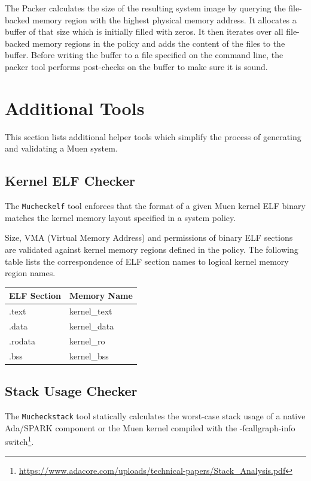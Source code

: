\documentclass[a4paper,twoside,titlepage]{article}
\begin{document}
The Packer calculates the size of the resulting system image by querying the
file-backed memory region with the highest physical memory address. It
allocates a buffer of that size which is initially filled with zeros. It then
iterates over all file-backed memory regions in the policy and adds the content
of the files to the buffer. Before writing the buffer to a file specified on
the command line, the packer tool performs post-checks on the buffer to make
sure it is sound.

\section{Additional Tools}
\label{sec:addtools}

This section lists additional helper tools which simplify the process of
generating and validating a Muen system.

\subsection{Kernel ELF Checker}
\label{sec:mucheckelf}
The \texttt{Mucheckelf} tool enforces that the format of a given Muen kernel
ELF binary matches the kernel memory layout specified in a system policy.

Size, VMA (Virtual Memory Address) and permissions of binary ELF sections are
validated against kernel memory regions defined in the policy. The following
table lists the correspondence of ELF section names to logical kernel memory
region names.

\begin{table}[h]
	\centering
	\begin{tabular}{l|l}
		\textbf{ELF Section} & \textbf{Memory Name} \\
		\hline
		.text   & kernel\_text \\
		.data   & kernel\_data \\
		.rodata & kernel\_ro   \\
		.bss    & kernel\_bss  \\
		\hline
	\end{tabular}
\end{table}

\subsection{Stack Usage Checker}
\label{sec:mucheckstack}
The \texttt{Mucheckstack} tool statically calculates the worst-case stack usage
of a native Ada/SPARK component or the Muen kernel compiled with the
-fcallgraph-info
switch\footnote{\url{https://www.adacore.com/uploads/technical-papers/Stack\_Analysis.pdf}}.
\end{document}
